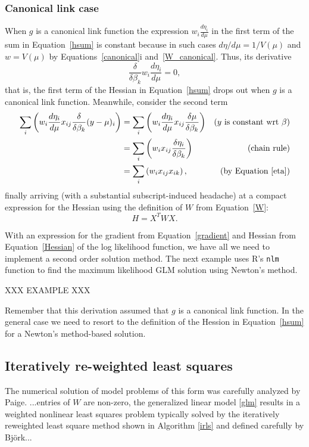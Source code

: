 \documentclass[10pt]{article} %
\begin{document}
\subsubsection*{Canonical link case}
When $g$ is a canonical link function
the expression $w_i\frac{d\eta_i}{d\mu}$ in the
first term of the sum in Equation~\ref{hsum}
is constant because in such cases
$d\eta/d\mu=1/V(\mu)$ and
$w=V(\mu)$ 
by Equations~\ref{canonical}i and~\ref{W_canonical}. Thus, its derivative
\[
\frac{\delta}{\delta\beta_k} w_i\frac{d\eta_i}{d\mu} = 0,
\]
that is, the first term of the Hessian in Equation~\ref{hsum}
drops out when $g$ is a canonical link function.
Meanwhile, consider the second term
\begin{align*}
\sum_i\left(
w_i\frac{d\eta_i}{d\mu}x_{ij}\frac{\delta}{\delta\beta_k}(y-\mu)_i
\right)  &=
\sum_i\left(
w_i\frac{d\eta_i}{d\mu}x_{ij}\frac{\delta\mu}{\delta\beta_k} \right) &\mbox{($y$ is constant wrt $\beta$)}  \\
&= 
\sum_i\left(
w_ix_{ij}\frac{\delta\eta_i}{\delta\beta_k} \right)&\mbox{(chain rule)}\\
&= 
\sum_i\left(
w_ix_{ij}x_{ik} \right), &\mbox{(by Equation \ref{eta})}
\end{align*}
finally arriving (with a substantial subscript-induced headache) at a compact
expression for the Hessian using the definition of $W$ from Equation~\ref{W}:
\begin{equation}\label{Hessian}
H = X^T W X.
\end{equation}

With an expression for the gradient from Equation~\ref{gradient} and Hessian
from Equation~\ref{Hessian} of the log likelihood function, we have all we need
to implement a second order solution method. The next example uses R's
\verb+nlm+ function to find the maximum likelihood GLM solution using Newton's
method.

XXX EXAMPLE XXX

Remember that this derivation assumed that $g$ is a canonical link function. In
the general case we need to resort to the definition of the Hession in
Equation~\ref{hsum} for a Newton's method-based solution.



\subsection*{Iteratively re-weighted least squares}




The numerical solution of model problems of this form was carefully analyzed by
Paige\cite{paige}.
...entries of $W$ are non-zero, the generalized linear model
\ref{glm} results in a weighted nonlinear least squares problem
typically solved by the iteratively reweighted least square method
shown in Algorithm \ref{irls} and defined carefully by Bj\"ork\cite{bjork}...
\end{document}
